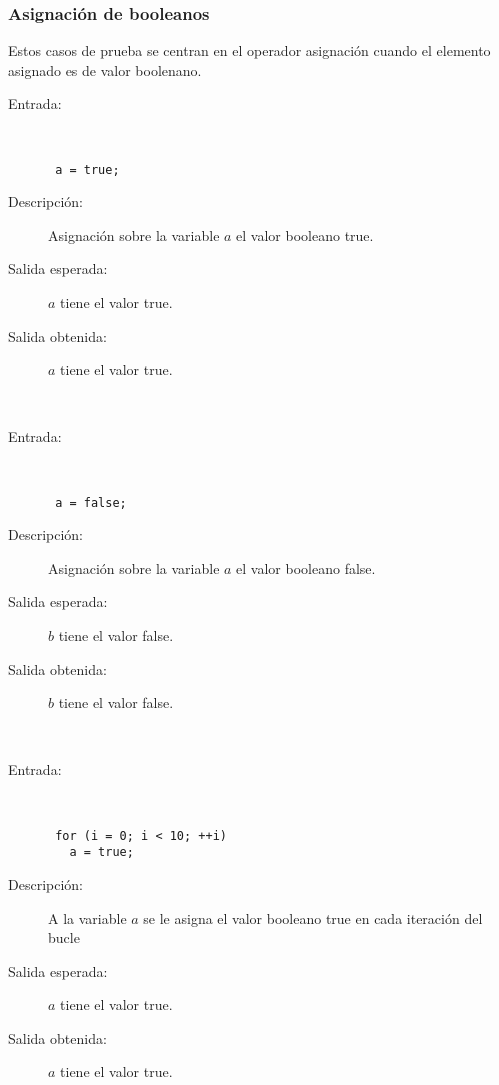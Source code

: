 \subsubsection{Asignación de booleanos}
Estos casos de prueba se centran en el operador asignación cuando el elemento asignado es de valor boolenano.

	\begin{description}
		\item [Entrada:]\hfill \\
\begin{lstlisting}
 a = true;
\end{lstlisting}
		\item [Descripción:] Asignación sobre la variable $a$ el valor booleano true.
		\item [Salida esperada:] $a$ tiene el valor true.
		\item [Salida obtenida:] $a$ tiene el valor true.
	\end{description} 
\hfil \\
	\begin{description}
		\item [Entrada:] \hfill \\
\begin{lstlisting}
 a = false;
\end{lstlisting}
		\item [Descripción:] Asignación sobre la variable $a$ el valor booleano false.
		\item [Salida esperada:] $b$ tiene el valor false.
		\item [Salida obtenida:] $b$ tiene el valor false.
	\end{description}
\hfil \\
	\begin{description}
		\item [Entrada:] \hfill \\
\begin{lstlisting}
 for (i = 0; i < 10; ++i) 
   a = true;
\end{lstlisting}
		\item [Descripción:] A la variable $a$ se le asigna el valor booleano true en cada iteración del bucle
		\item [Salida esperada:] $a$ tiene el valor true.
		\item [Salida obtenida:] $a$ tiene el valor true.
	\end{description} 
